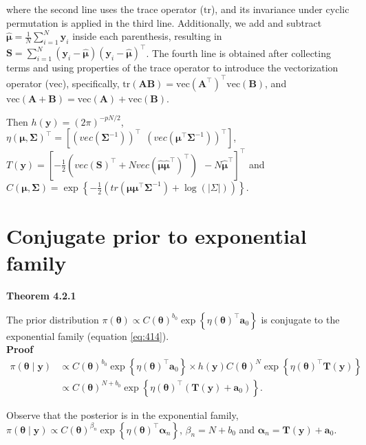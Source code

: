 \begin{enumerate}
where the second line uses the trace operator ($\text{tr}$), and its invariance under cyclic permutation is applied in the third line. Additionally, we add and subtract $\hat{\bm{\mu}} = \frac{1}{N}\sum_{i=1}^N \bm{y}_i$ inside each parenthesis, resulting in $\bm{S} = \sum_{i=1}^N \left(\bm{y}_i - \hat{\bm{\mu}}\right) \left(\bm{y}_i - \hat{\bm{\mu}}\right)^{\top}$. The fourth line is obtained after collecting terms and using properties of the trace operator to introduce the vectorization operator ($\text{vec}$), specifically, $ \text{tr}(\bm{AB}) = \text{vec}(\bm{A}^{\top})^{\top} \text{vec}(\bm{B})$, and $ \text{vec}(\bm{A} + \bm{B}) = \text{vec}(\bm{A}) + \text{vec}(\bm{B})$.

Then $h(\bm{y})=(2\pi)^{-pN/2}$, $\eta(\bm{\mu},\bm{\Sigma})^{\top}=\left[\left(vec\left(\bm{\Sigma}^{-1}\right)\right)^{\top} \ \ \left(vec\left(\bm{\mu}^{\top}\bm{\Sigma}^{-1}\right)\right)^{\top}\right]$, $T(\bm{y})=\left[-\frac{1}{2}\left(vec\left(\bm{S}\right)^{\top}+N vec\left(\hat{\bm{\mu}}\hat{\bm{\mu}}^{\top}\right)^{\top}\right) \ \ -N\hat{\bm{\mu}}^{\top}\right]^{\top}$ and $C(\bm{\mu},\bm{\Sigma})=\exp\left\{-\frac{1}{2}\left(tr\left(\bm{\mu}\bm{\mu}^{\top}\bm{\Sigma}^{-1}\right)+\log(|\Sigma|)\right)\right\}$.
\end{enumerate}

\section{Conjugate prior to exponential family}\label{sec42}

\textbf{Theorem 4.2.1}

The prior distribution $\pi(\bm{\theta})\propto C(\bm{\theta})^{b_0}\exp\left\{\eta(\bm{\theta})^{\top}\bm{a}_0\right\}$ is conjugate to the exponential family (equation \ref{eq:414}).\\

\textbf{Proof}
\begin{align}
	\pi(\bm{\theta}\mid \bm{y})& \propto C(\bm{\theta})^{b_0}\exp\left\{\eta(\bm{\theta})^{\top}\bm{a}_0\right\} \times h(\bm{y}) C(\bm{\theta})^N\exp\left\{\eta(\bm{\theta})^{\top}\bm{T}(\bm{y})\right\}\nonumber\\
	& \propto C(\bm{\theta})^{N+b_0} \exp\left\{\eta(\bm{\theta})^{\top}(\bm{T}(\bm{y})+\bm{a}_0)\right\}.\nonumber 
\end{align}

Observe that the posterior is in the exponential family, $\pi(\bm{\theta}\mid \bm{y})\propto C(\bm{\theta})^{\beta_n} \exp\left\{\eta(\bm{\theta})^{\top}\bm{\alpha}_n\right\}$, $\beta_n=N+b_0$ and $\bm{\alpha}_n=\bm{T}(\bm{y})+\bm{a}_0$.\\

